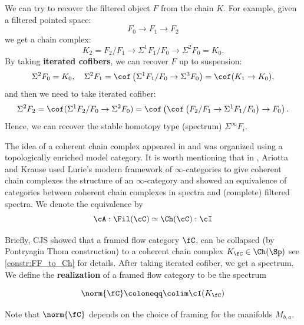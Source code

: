 We can try to recover the filtered object $F$ from the chain $K$. For example, given a filtered pointed space:
\begin{equation*}
    F_0 \to F_1 \to F_2
\end{equation*}
we get a chain complex:
\begin{equation*}
    K_2 = F_2/F_1 \to \Sigma^1 F_1/F_0 \to \Sigma^2 F_0 = K_0.
\end{equation*}
By taking \textbf{iterated cofibers}, we can recover $F$ up to suspension:
\begin{equation*}
    \Sigma^2 F_0 = K_0, \quad \Sigma^2 F_1 = \cof \left (\Sigma^1 F_1/F_0 \to \Sigma^3 F_0\right ) = \cof (K_1 \to K_0 ),
\end{equation*}
and then we need to take iterated cofiber:
\begin{equation*}
    \Sigma^2 F_2 = \cof(\Sigma^1 F_2/F_0 \to \Sigma^2 F_0) = \cof \left ( \cof \left (F_2/F_1 \to \Sigma^1 F_1/F_0\right ) \to F_0 \right).
\end{equation*}
Hence, we can recover the stable homotopy type (spectrum) $\Sigma^\infty F_i$.

The idea of a coherent chain complex appeared in \cite{CJS95} and was organized using a topologically enriched model category. It is worth mentioning that in \cite{Ari21}, Ariotta and Krause used Lurie's modern framework of $\infty$-categories to give coherent chain complexes the structure of an $\infty$-category and showed an equivalence of categories between coherent chain complexes in spectra and (complete) filtered spectra. 
We denote the equivalence by 
\begin{equation*}
    \cA: \Fil(\cC) \simeq \Ch(\cC) : \cI
\end{equation*}

Briefly, CJS showed that a framed flow category $\fC$, can be collapsed (by Pontryagin Thom construction) to a coherent chain complex $K_{\fC} \in \Ch(\Sp)$ see \ref{constr:FF_to_Ch} for details. After taking iterated cofiber, we get a spectrum.
We define the \textbf{realization} of a framed flow category to be the spectrum
\begin{defn}\label{def:realofFFCat}
    \begin{equation}
        \norm{\fC} \coloneqq \colim \cI(K_{\fC})
    \end{equation}    
\end{defn}
\begin{rem*}
    Note that $\norm{\fC}$ depends on the choice of framing for the manifolds $M_{b,a}$.
\end{rem*}

